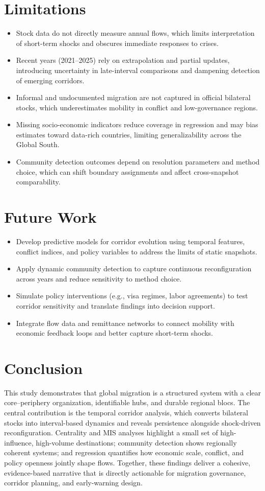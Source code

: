 \documentclass[12pt]{report}
\begin{document}
\chapter{Limitations}
\begin{itemize}
  \item Stock data do not directly measure annual flows, which limits interpretation of short-term shocks and obscures immediate responses to crises.
  \item Recent years (2021--2025) rely on extrapolation and partial updates, introducing uncertainty in late-interval comparisons and dampening detection of emerging corridors.
  \item Informal and undocumented migration are not captured in official bilateral stocks, which underestimates mobility in conflict and low-governance regions.
  \item Missing socio-economic indicators reduce coverage in regression and may bias estimates toward data-rich countries, limiting generalizability across the Global South.
  \item Community detection outcomes depend on resolution parameters and method choice, which can shift boundary assignments and affect cross-snapshot comparability.
\end{itemize}

\chapter{Future Work}
\begin{itemize}
  \item Develop predictive models for corridor evolution using temporal features, conflict indices, and policy variables to address the limits of static snapshots.
  \item Apply dynamic community detection to capture continuous reconfiguration across years and reduce sensitivity to method choice.
  \item Simulate policy interventions (e.g., visa regimes, labor agreements) to test corridor sensitivity and translate findings into decision support.
  \item Integrate flow data and remittance networks to connect mobility with economic feedback loops and better capture short-term shocks.
\end{itemize}

\chapter{Conclusion}
This study demonstrates that global migration is a structured system with a clear core--periphery organization, identifiable hubs, and durable regional blocs. The central contribution is the temporal corridor analysis, which converts bilateral stocks into interval-based dynamics and reveals persistence alongside shock-driven reconfiguration. Centrality and MIS analyses highlight a small set of high-influence, high-volume destinations; community detection shows regionally coherent systems; and regression quantifies how economic scale, conflict, and policy openness jointly shape flows. Together, these findings deliver a cohesive, evidence-based narrative that is directly actionable for migration governance, corridor planning, and early-warning design.
\end{document}
